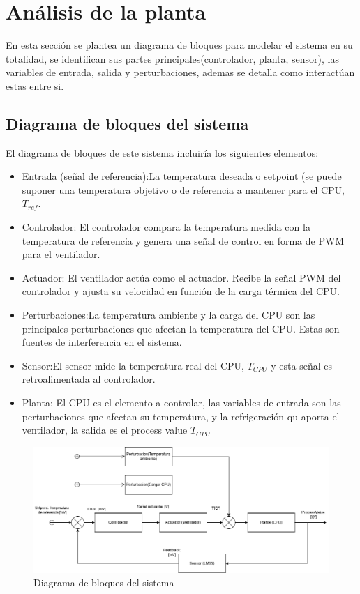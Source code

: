 \documentclass[12pt]{article}
\begin{document}
\section{Análisis de la planta}
	 En esta sección se plantea un diagrama de bloques para modelar el sistema en su totalidad, se identifican sus partes principales(controlador, planta, sensor), las variables de entrada, salida y perturbaciones, ademas se detalla como interactúan estas entre si.
	 
	 \subsection{Diagrama de bloques del sistema}
	 El diagrama de bloques de este sistema incluiría los siguientes elementos:
	 \begin{itemize}
	 	\item Entrada (señal de referencia):La temperatura deseada o setpoint (se puede suponer una temperatura objetivo o de referencia a mantener para el CPU, $T_{ref}$.
	 	\item Controlador: El controlador compara la temperatura medida con la temperatura de referencia y genera una señal de control en forma de PWM para el ventilador.
	 	\item Actuador: El ventilador actúa como el actuador. Recibe la señal PWM del controlador y ajusta su velocidad en función de la carga térmica del CPU.
	 	\item Perturbaciones:La temperatura ambiente y la carga del CPU son las principales perturbaciones que afectan la temperatura del CPU. Estas son fuentes de interferencia en el sistema.
	 	\item Sensor:El sensor mide la temperatura real del CPU, $T_{CPU}$ y esta señal es retroalimentada al controlador.
	 	\item Planta: El CPU es el elemento a controlar, las variables de entrada son las perturbaciones que afectan su temperatura, y la refrigeración qu aporta el ventilador, la salida es el process value $T_{CPU}$
	 \end{itemize}
	 
	\begin{figure}
		\includegraphics[width=1\linewidth]{Imagenes/diagrama_de_flujo}
		\caption[Diagrama de bloques del sistema]{Diagrama de bloques del sistema}
		\label{fig:diagramadeflujo}
	\end{figure}
	
\end{document}
